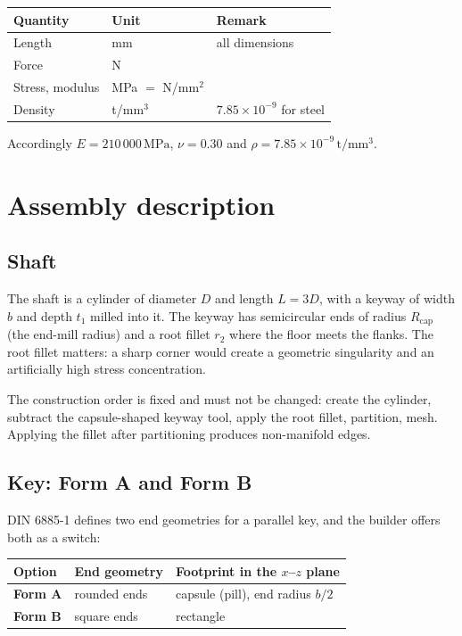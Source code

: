\documentclass[11pt,a4paper]{article}
\newcommand{\unit}[1]{\,\mathrm{#1}}
\begin{document}
\begin{center}
\begin{tabular}{lll}
\toprule
Quantity & Unit & Remark \\
\midrule
Length & mm & all dimensions \\
Force & N & \\
Stress, modulus & MPa $=$ N/mm$^2$ & \\
Density & t/mm$^3$ & $7.85\times10^{-9}$ for steel \\
\bottomrule
\end{tabular}
\end{center}

\noindent
Accordingly $E = 210\,000\unit{MPa}$, $\nu = 0.30$ and
$\rho = 7.85\times10^{-9}\unit{t/mm^3}$.

\section{Assembly description}
\label{sec:geom}

\subsection{Shaft}
The shaft is a cylinder of diameter $D$ and length $L = 3D$, with a keyway of
width $b$ and depth $t_1$ milled into it. The keyway has semicircular ends of
radius $R_{\text{cap}}$ (the end-mill radius) and a root fillet $r_2$ where the
floor meets the flanks. The root fillet matters: a sharp corner would create a
geometric singularity and an artificially high stress concentration.

The construction order is fixed and must not be changed: create the cylinder,
subtract the capsule-shaped keyway tool, apply the root fillet, partition, mesh.
Applying the fillet after partitioning produces non-manifold edges.

\subsection{Key: Form A and Form B}
\label{sec:key}
DIN 6885-1 defines two end geometries for a parallel key, and the builder offers
both as a switch:

\begin{center}
\begin{tabular}{lll}
\toprule
Option & End geometry & Footprint in the $x$--$z$ plane \\
\midrule
\textbf{Form A} & rounded ends & capsule (pill), end radius $b/2$ \\
\textbf{Form B} & square ends & rectangle \\
\bottomrule
\end{tabular}
\end{center}
\end{document}

